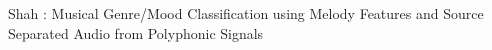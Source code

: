 \documentclass[12pt,journal,compsoc]{IEEEtran}
\begin{document}
%
{Shah : Musical Genre/Mood Classification using Melody Features and Source Separated Audio from Polyphonic Signals}
% 






\end{document}
